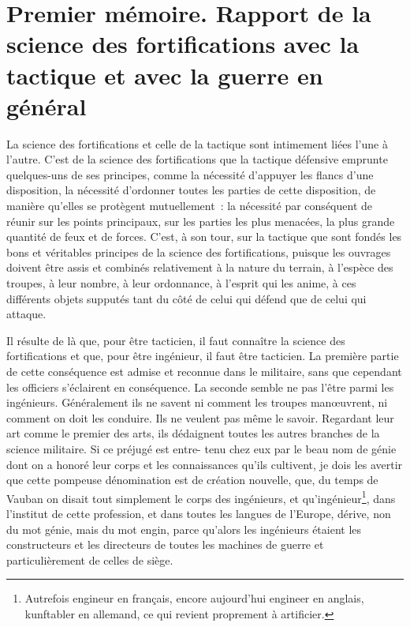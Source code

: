 \documentclass[french,twoside]{book} %
\begin{document}
\section[{Premier mémoire. Rapport de la science des fortifications avec la tactique et avec la guerre en général}]{Premier mémoire. Rapport de la science des fortifications avec la tactique et avec la guerre en général}\renewcommand{\leftmark}{Premier mémoire. Rapport de la science des fortifications avec la tactique et avec la guerre en général}

\noindent La science des fortifications et celle de la tactique sont intimement liées l’une à l’autre. C’est de la science des fortifications que la tactique défensive emprunte quelques-uns de ses principes, comme la nécessité d’appuyer les flancs d’une disposition, la nécessité d’ordonner toutes les parties de cette disposition, de manière qu’elles se protègent mutuellement : la nécessité par conséquent de réunir sur les points principaux, sur les parties les plus menacées, la plus grande quantité de feux et de forces. C’est, à son tour, sur la tactique que sont fondés les bons et véritables principes de la science des fortifications, puisque les ouvrages doivent être assis et combinés relativement à la nature du terrain, à l’espèce des troupes, à leur nombre, à leur ordonnance, à l’esprit qui les anime, à ces différents objets supputés tant du côté de celui qui défend que de celui qui attaque.\par
Il résulte de là que, pour être tacticien, il faut connaître la science des fortifications et que, pour être ingénieur, il faut être tacticien. La première partie de cette conséquence est admise et reconnue dans le militaire, sans que cependant les officiers s’éclairent en conséquence. La seconde semble ne pas l’être parmi les ingénieurs. Généralement ils ne savent ni comment les troupes manœuvrent, ni comment on doit les conduire. Ils ne veulent pas même le savoir. Regardant leur art comme le premier des arts, ils dédaignent toutes les autres branches de la science militaire. Si ce préjugé est entre- tenu chez eux par le beau nom de génie dont on a honoré leur corps et les connaissances qu’ils cultivent, je dois les avertir que cette pompeuse dénomination est de création nouvelle, que, du temps de Vauban on disait tout simplement le corps des ingénieurs, et qu’ingénieur\footnote{Autrefois engineur en français, encore aujourd’hui engineer en anglais, kunftabler en allemand, ce qui revient proprement à artificier.}, dans l’institut de cette profession, et dans toutes les langues de l’Europe, dérive, non du mot génie, mais du mot engin, parce qu’alors les ingénieurs étaient les constructeurs et les directeurs de toutes les machines de guerre et particulièrement de celles de siège.\par
\end{document}
